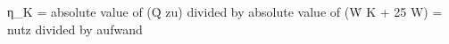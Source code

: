 η_K = absolute value of (Q̇ zu) divided by absolute value of (Ẇ K + 25 W)  
= nutz divided by aufwand